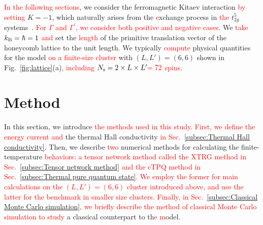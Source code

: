 \documentclass[twocolumn,superscriptaddress,showpacs, longbibliography, aps, prb]{revtex4-2}
\newcommand{\red}[1]{\textcolor{red}{#1}}
\newcommand{\orange}[1]{\textcolor{orange}{#1}}
\begin{document}
\red{In the following sections}, we consider the ferromagnetic Kitaev interaction \red{by setting} $K= -1$, which %
naturally arises from the %
\red{e}xchange process in \red{the} $t_{2g}^5$ systems\red{~\cite{Jackeli_PRL2009}}. 
\red{For $\Gamma$ and $\Gamma^\prime$, we consider both positive and negative cases.} 
We %
\red{take $k_{\rm B} = \hbar = 1$ and} set the %
\red{length} of the primitive translation vector of the honeycomb 
lattice to the unit length\red{.} %
We typically %
\red{compute} physical quantities 
for the model %
\red{on a finite-size cluster} with $(L, L') = (6, 6)$ shown in Fig.~\ref{fig:lattice}(a)\red{, including} %
$N_{\rm s}=2\times L\times L^{\prime} \red{=72}$ \red{spins}.

\section{Method}
\label{sec:method}
In this section, we %
introduce \red{the methods used in this study. 
First, we define %
the energy current and} 
the thermal Hall conductivity %
\red{in Sec.~\ref{subsec:Thermal Hall conductivity}}. Then, we %
describe %
\red{two} 
numerical methods for calculating the finite-temperature %
\red{behaviors: a tensor network method called the XTRG method in Sec.~\ref{subsec:Tensor network method} and the cTPQ method in Sec.~\ref{subsec:Thermal pure quantum state}. 
We employ the former for main calculations on the $(L, L') = (6, 6)$ cluster introduced above, and use the latter for the benchmark in smaller size clusters.}
\red{Finally, in Sec.~\ref{subsec:Classical Monte Carlo simulation}, we briefly describe the method of classical Monte Carlo simulation to study} a %
classical counterpart to th\red{e %
m}odel\red{.} %
\end{document}
